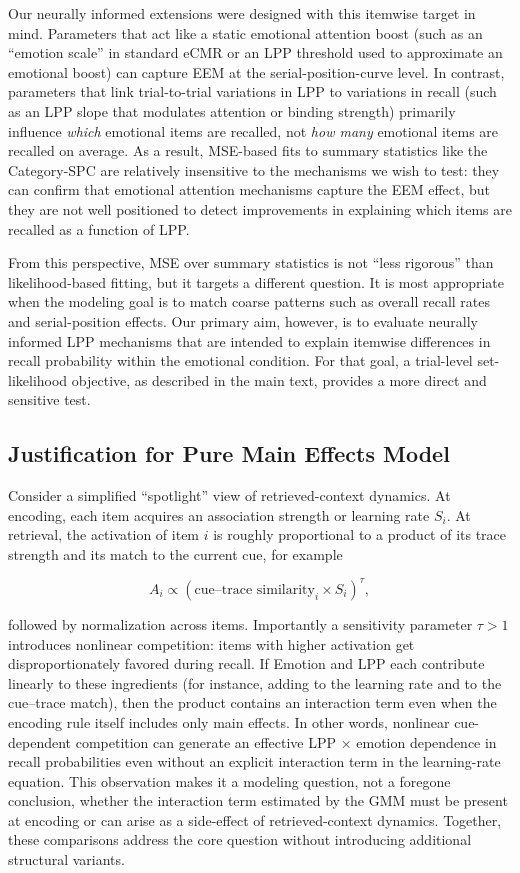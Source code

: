 \documentclass[
  man,
  longtable,
  nolmodern,
  notxfonts,
  notimes,
  draftfirst,
  colorlinks=true,linkcolor=blue,citecolor=blue,urlcolor=blue]{apa7}
\begin{document}
Our neurally informed extensions were designed with this itemwise target
in mind. Parameters that act like a static emotional attention boost
(such as an ``emotion scale'' in standard eCMR or an LPP threshold used
to approximate an emotional boost) can capture EEM at the
serial-position-curve level. In contrast, parameters that link
trial-to-trial variations in LPP to variations in recall (such as an LPP
slope that modulates attention or binding strength) primarily influence
\emph{which} emotional items are recalled, not \emph{how many} emotional
items are recalled on average. As a result, MSE-based fits to summary
statistics like the Category-SPC are relatively insensitive to the
mechanisms we wish to test: they can confirm that emotional attention
mechanisms capture the EEM effect, but they are not well positioned to
detect improvements in explaining which items are recalled as a function
of LPP.

From this perspective, MSE over summary statistics is not ``less
rigorous'' than likelihood-based fitting, but it targets a different
question. It is most appropriate when the modeling goal is to match
coarse patterns such as overall recall rates and serial-position
effects. Our primary aim, however, is to evaluate neurally informed LPP
mechanisms that are intended to explain itemwise differences in recall
probability within the emotional condition. For that goal, a trial-level
set-likelihood objective, as described in the main text, provides a more
direct and sensitive test.

\subsection{Justification for Pure Main Effects
Model}\label{justification-for-pure-main-effects-model}

Consider a simplified ``spotlight'' view of retrieved-context dynamics.
At encoding, each item acquires an association strength or learning rate
\(S_i\). At retrieval, the activation of item \(i\) is roughly
proportional to a product of its trace strength and its match to the
current cue, for example

\[
A_i \propto (\text{cue–trace similarity}_i \times S_i)^\tau,
\]

followed by normalization across items. Importantly a sensitivity
parameter \(\tau > 1\) introduces nonlinear competition: items with
higher activation get disproportionately favored during recall. If
Emotion and LPP each contribute linearly to these ingredients (for
instance, adding to the learning rate and to the cue--trace match), then
the product contains an interaction term even when the encoding rule
itself includes only main effects. In other words, nonlinear
cue-dependent competition can generate an effective LPP × emotion
dependence in recall probabilities even without an explicit interaction
term in the learning-rate equation. This observation makes it a modeling
question, not a foregone conclusion, whether the interaction term
estimated by the GMM must be present at encoding or can arise as a
side-effect of retrieved-context dynamics. Together, these comparisons
address the core question without introducing additional structural
variants.
\end{document}
